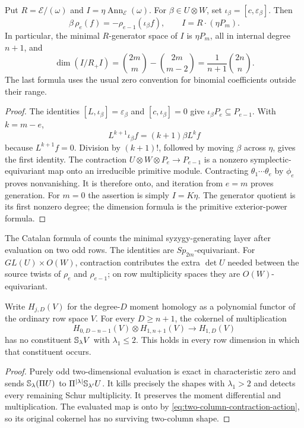 \begin{proposition}
\label{prop:two-column-module}
Put $R=\mathcal E/(\omega)$ and
$I=\eta\operatorname{Ann}_{\mathcal E}(\omega)$.
For $\beta\in U\otimes W$, set
$\iota_\beta=[c,\varepsilon_\beta]$. Then
\begin{equation}\label{eq:two-column-contraction-action}
 \beta\,\rho_e(f)=-\rho_{e-1}(\iota_\beta f),
 \qquad
 I=R\cdot(\eta P_m).
\end{equation}
In particular, the minimal $R$-generator space of $I$ is $\eta P_m$,
all in internal degree $n+1$, and
\[
 \dim(I/R_+I)
   =\binom{2m}{m}-\binom{2m}{m-2}
   =\frac{1}{n+1}\binom{2n}{n}.
\]
The last formula uses the usual zero convention for binomial
coefficients outside their range.
\end{proposition}
\begin{proof}
The identities $[L,\iota_\beta]=\varepsilon_\beta$ and
$[c,\iota_\beta]=0$ give
$\iota_\beta P_e\subseteq P_{e-1}$. With $k=m-e$,
\[
 L^{k+1}\iota_\beta f=(k+1)\beta L^kf
\]
because $L^{k+1}f=0$. Division by $(k+1)!$, followed by moving
$\beta$ across $\eta$, gives the first identity.
The contraction $U\otimes W\otimes P_e\to P_{e-1}$ is a nonzero
symplectic-equivariant map onto an irreducible primitive module.
Contracting $\theta_1\cdots\theta_e$ by $\phi_e$ proves nonvanishing.
It is therefore onto, and iteration from $e=m$ proves generation.
For $m=0$ the assertion is simply $I=K\eta$.
The generator quotient is its first nonzero degree; the dimension
formula is the primitive exterior-power formula.
\end{proof}

The Catalan formula of \cite[Corollary~4.4]{KimRhoades}
counts the minimal syzygy-generating layer after evaluation on two odd rows.
The identities are $Sp_{2m}$-equivariant. For $GL(U)\times O(W)$,
contraction contributes the extra $\det U$ needed between the source
twists of $\rho_e$ and $\rho_{e-1}$; on row multiplicity spaces they
are $O(W)$-equivariant.

\begin{corollary}
\label{cor:two-column-syzygy-generation}
Write $H_{j,D}(V)$ for the degree-$D$ moment homology as a polynomial
functor of the ordinary row space $V$. For every $D\ge n+1$, the
cokernel of multiplication
\[
 H_{0,D-n-1}(V)\otimes H_{1,n+1}(V)
                         \longrightarrow H_{1,D}(V)
\]
has no constituent $\mathbb S_\lambda V$ with $\lambda_1\le2$.
This holds in every row dimension in which that constituent occurs.
\end{corollary}
\begin{proof}
Purely odd two-dimensional evaluation is exact in characteristic
zero and sends
$\mathbb S_\lambda(\Pi U)$ to
$\Pi^{|\lambda|}\mathbb S_{\lambda'}U$.
It kills precisely the shapes with $\lambda_1>2$ and detects every
remaining Schur multiplicity. It preserves the moment differential
and multiplication. The evaluated map is onto by
\eqref{eq:two-column-contraction-action}, so its original cokernel
has no surviving two-column shape.
\end{proof}

